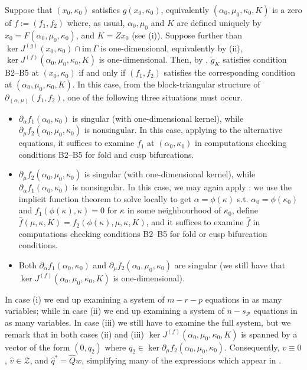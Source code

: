 \documentclass[11pt]{amsart}
\renewcommand{\k}{\kappa}
\newcommand{\wQ}{\widehat{Q}}
\newcommand{\mP}{\mathcal{P}}
\newcommand{\mZ}{\mathcal{Z}}
\theoremstyle{definition}
\begin{document}
Suppose that $(x_0, \k_0)$ satisfies $g(x_0, \k_0)$, equivalently $(\alpha_0, \mu_0, \k_0,K)$ is a zero of $f:=(f_1, f_2)$ where, as usual, $\alpha_0, \mu_0$ and $K$ are defined uniquely by $x_0 = F(\alpha_0, \mu_0, \k_0)$, and $K = Zx_0$ (see (i)). Suppose further than $\ker J^{(g)} (x_0, \k_0) \cap \mathrm{im}\,\Gamma$ is one-dimensional, equivalently by (ii), $\ker J^{(f)}(\alpha_0, \mu_0, \k_0,K)$ is one-dimensional. Then, by , $\tilde{g}_K$ satisfies condition B2--B5 at $(x_0, \k_0)$ if and only if $(f_1, f_2)$ satisfies the corresponding condition at $(\alpha_0, \mu_0, \k_0,K)$. In this case, from the block-triangular structure of $\partial_{(\alpha,\mu)}(f_1, f_2)$, one of the following three situations must occur. 
\begin{itemize}
\item[(i)] $\partial_\alpha f_1(\alpha_0, \k_0)$ is singular (with one-dimensional kernel), while $\partial_{\mu} f_2(\alpha_0, \mu_0, \k_0)$ is nonsingular. In this case, applying  to the alternative equations, it suffices to examine $f_1$ at $(\alpha_0, \k_0)$ in computations checking conditions B2--B5 for fold and cusp bifurcations.
\item[(ii)] $\partial_{\mu} f_2(\alpha_0, \mu_0, \k_0)$ is singular (with one-dimensional kernel), while $\partial_\alpha f_1(\alpha_0, \k_0)$ is nonsingular. In this case, we may again apply : we use the implicit function theorem to solve locally to get $\alpha=\phi(\k)$ s.t. $\alpha_0 = \phi(\k_0)$ and $f_1(\phi(\k),\k)=0$ for $\k$ in some neighbourhood of $\k_0$, define $\hat{f}(\mu, \k, K) = f_2(\phi(\k), \mu, \k, K)$, and it suffices to examine $\hat{f}$ in computations checking conditions B2--B5 for fold or cusp bifurcation conditions. 
\item[(iii)] Both $\partial_\alpha f_1(\alpha_0, \k_0)$ and $\partial_{\mu} f_2(\alpha_0, \mu_0, \k_0)$ are singular (we still have that $\ker J^{(f)}(\alpha_0, \mu_0, \k_0,K)$ is one-dimensional).
\end{itemize}
In case (i) we end up examining a system of $m-r-p$ equations in as many variables; while in case (ii) we end up examining a system of $n-s_{\mP}$ equations in as many variables. In case (iii) we still have to examine the full system, but we remark that in both cases (ii) and (iii) $\ker J^{(f)}(\alpha_0, \mu_0, \k_0,K)$ is spanned by a vector of the form $(0,q_2)$ where $q_2 \in \ker \partial_{\mu} f_2(\alpha_0, \mu_0, \k_0)$. Consequently, $v\equiv 0$, $\hat{v} \in \mZ$, and $\hat{q}^* = \wQ w$, simplifying many of the expressions which appear in . 
\end{document}
